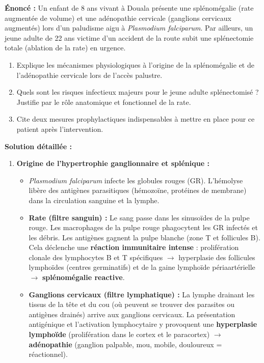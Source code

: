 \documentclass[11pt]{article}
\begin{document}
\begin{exoresolu}
    \textbf{Énoncé :} Un enfant de 8 ans vivant à Douala présente une splénomégalie (rate augmentée de volume) et une adénopathie cervicale (ganglions cervicaux augmentés) lors d'un paludisme aigu à \emph{Plasmodium falciparum}. Par ailleurs, un jeune adulte de 22 ans victime d'un accident de la route subit une splénectomie totale (ablation de la rate) en urgence.
    \begin{enumerate}
        \item Explique les mécanismes physiologiques à l'origine de la splénomégalie et de l'adénopathie cervicale lors de l'accès palustre.
        \item Quels sont les risques infectieux majeurs pour le jeune adulte splénectomisé ? Justifie par le rôle anatomique et fonctionnel de la rate.
        \item Cite deux mesures prophylactiques indispensables à mettre en place pour ce patient après l'intervention.
    \end{enumerate}
    \tcblower
    \textbf{Solution détaillée :}
    \begin{enumerate}
        \item \textbf{Origine de l'hypertrophie ganglionnaire et splénique :}
        \begin{itemize}
            \item \emph{Plasmodium falciparum} infecte les globules rouges (GR). L'hémolyse libère des antigènes parasitiques (hémozoïne, protéines de membrane) dans la circulation sanguine et la lymphe.
            \item \textbf{Rate (filtre sanguin) :} Le sang passe dans les sinusoïdes de la pulpe rouge. Les macrophages de la pulpe rouge phagocytent les GR infectés et les débris. Les antigènes gagnent la pulpe blanche (zone T et follicules B). Cela déclenche une \textbf{réaction immunitaire intense} : prolifération clonale des lymphocytes B et T spécifiques $\rightarrow$ hyperplasie des follicules lymphoïdes (centres germinatifs) et de la gaine lymphoïde périaartérielle $\rightarrow$ \textbf{splénomégalie reactive}.
            \item \textbf{Ganglions cervicaux (filtre lymphatique) :} La lymphe drainant les tissus de la tête et du cou (où peuvent se trouver des parasites ou antigènes drainés) arrive aux ganglions cervicaux. La présentation antigénique et l'activation lymphocytaire y provoquent une \textbf{hyperplasie lymphoïde} (prolifération dans le cortex et le paracortex) $\rightarrow$ \textbf{adénopathie} (ganglion palpable, mou, mobile, douloureux = réactionnel).

\end{itemize}
\end{enumerate}
\end{exoresolu}
\end{document}
